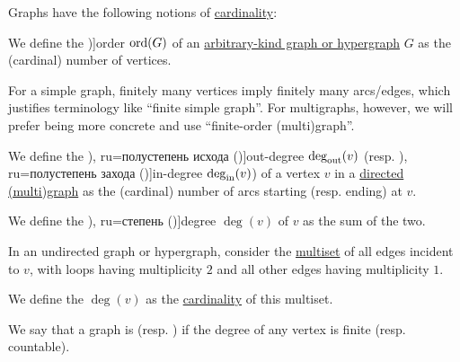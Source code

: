 \begin{definition}\label{def:graph_cardinality}
  Graphs have the following notions of \hyperref[thm:cardinality_existence]{cardinality}:
  \begin{thmenum}
     We define the \term[ru=порядок (\cite[9]{Емеличев1990Графы})]{order} \( \operatorname{ord}(G) \) of an \hyperref[rem:arbitrary_kind_graph]{arbitrary-kind graph or hypergraph} \( G \) as the (cardinal) number of vertices.

    For a simple graph, finitely many vertices imply finitely many arcs/edges, which justifies terminology like \enquote{finite simple graph}. For multigraphs, however, we will prefer being more concrete and use \enquote{finite-order (multi)graph}.

     We define the \term[bg=полустепен на изхода (\incite[8]{Мирчев2001Графи}), ru=полустепень исхода (\cite[283]{Емеличев1990Графы})]{out-degree} \( \deg_{\op{out}}(v) \) (resp. \term[bg=полустепен на входа (\incite[8]{Мирчев2001Графи}), ru=полустепень захода (\cite[283]{Емеличев1990Графы})]{in-degree} \( \deg_{\op{in}}(v) \)) of a vertex \( v \) in a \hyperref[def:directed_multigraph]{directed (multi)graph} as the (cardinal) number of arcs starting (resp. ending) at \( v \).

    We define the \term[bg=степен (\cite[8]{Мирчев2001Графи}), ru=степень (\cite[283]{Емеличев1990Графы})]{degree} \( \deg(v) \) of \( v \) as the sum of the two.

    \mimprovised In an undirected graph or hypergraph, consider the \hyperref[def:multiset]{multiset} of all edges incident to \( v \), with loops having multiplicity \( 2 \) and all other edges having multiplicity \( 1 \).

    We define the  \( \deg(v) \) as the \hyperref[def:multiset/cardinality]{cardinality} of this multiset.

     We say that a graph is  (resp. ) if the degree of any vertex is finite (resp. countable).
  \end{thmenum}
\end{definition}

